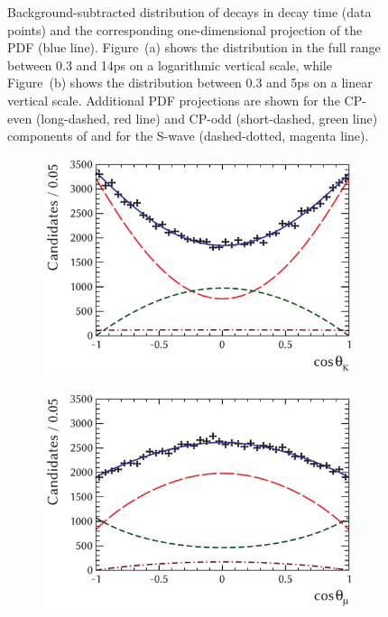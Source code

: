 \begin{figure}[htb]
  \caption{Background-subtracted distribution of decays in decay time (data points)
           and the corresponding one-dimensional projection of the PDF (blue line).
           Figure~(a) shows the distribution in the full range between 0.3 and 14\unitsp{}ps
           on a logarithmic vertical scale, while Figure~(b) shows the distribution between 0.3 and 5\unitsp{}ps
           on a linear vertical scale.
           Additional PDF projections are shown for the CP-even (long-dashed, red line) and CP-odd (short-dashed, green line)
           components of \BstoJpsiphi{} and for the S-wave (dashed-dotted, magenta line).}
  \label{fig:timeProjections}
\end{figure}
%
\begin{figure}[htbp]
  \centering
  \begin{subfigure}{0.49\textwidth}
    \includegraphics[width=\textwidth]{graphics/results/ctk}
    \caption{}
  \end{subfigure}
  \hfill%
  \begin{subfigure}{0.49\textwidth}
    \includegraphics[width=\textwidth]{graphics/results/ctl}
    \caption{}
  \end{subfigure}


\end{figure}
